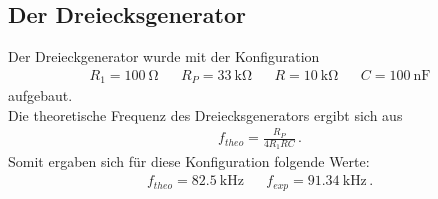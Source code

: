 \documentclass[]{scrartcl}
\begin{document}
\subsection{Der Dreiecksgenerator}
Der Dreieckgenerator wurde mit der Konfiguration
\begin{align*}
R_1=\SI{100}{\ohm} && R_P=\SI{33}{\kilo\ohm} && R=\SI{10}{\kilo\ohm} && C=\SI{100}{\nano\farad}
\end{align*}
aufgebaut. \\
Die theoretische Frequenz des Dreiecksgenerators ergibt sich aus
\begin{align}
f_{theo}=\frac{R_P}{4R_1RC}\,.
\end{align}
Somit ergaben sich für diese Konfiguration folgende Werte:
\begin{align}
f_{theo}=\SI{82.5}{\kilo\hertz} &  & f_{exp}=\SI{91.34}{\kilo\hertz}\,.
\end{align}
\end{document}
